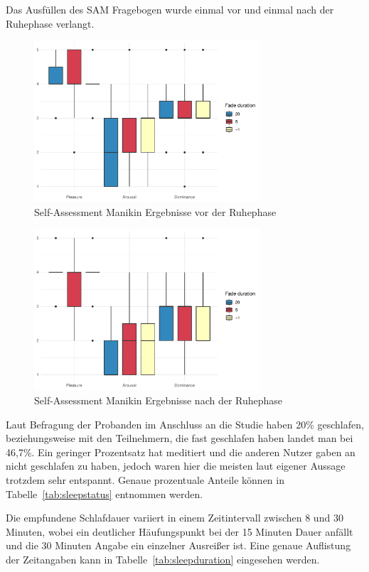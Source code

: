 
Das Ausfüllen des SAM Fragebogen wurde einmal vor und einmal nach der Ruhephase verlangt. 

\begin{figure}[H]
	\centering
	\includegraphics[width=0.75\textwidth]{./_StudyResults/SAMpre}
	\caption{Self-Assessment Manikin Ergebnisse vor der Ruhephase}
	\label{fig:samPre}
\end{figure}
\begin{figure}[H]
	\centering
	\includegraphics[width=0.75\textwidth]{./_StudyResults/SAMpost}
	\caption{Self-Assessment Manikin Ergebnisse nach der Ruhephase}
	\label{fig:samPost}
\end{figure}


Laut Befragung der Probanden im Anschluss an die Studie haben 20\% geschlafen, beziehungsweise mit den Teilnehmern, die fast geschlafen haben landet man bei 46,7\%. Ein geringer Prozentsatz hat meditiert und die anderen Nutzer gaben an nicht geschlafen zu haben, jedoch waren hier die meisten laut eigener Aussage trotzdem sehr entspannt. Genaue prozentuale Anteile können in Tabelle~\ref{tab:sleepstatus} entnommen werden. 

Die empfundene Schlafdauer variiert in einem Zeitintervall zwischen 8 und 30 Minuten, wobei ein deutlicher Häufungspunkt bei der 15 Minuten Dauer anfällt und die 30 Minuten Angabe ein einzelner Ausreißer ist. Eine genaue Auflistung der Zeitangaben kann in Tabelle~\ref{tab:sleepduration} eingesehen werden.
